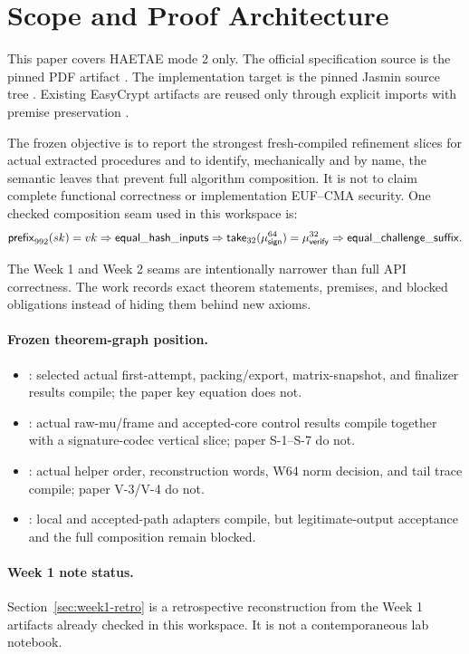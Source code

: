 \section{Scope and Proof Architecture}

This paper covers HAETAE mode 2 only. The official specification source is the
pinned PDF artifact \cite{haetae-pdf}. The implementation target is the pinned
Jasmin source tree \cite{haetae-jasmin}. Existing EasyCrypt artifacts are
reused only through explicit imports with premise preservation
\cite{haetae-ref-easycrypt}.

The frozen objective is to report the strongest fresh-compiled refinement
slices for actual extracted procedures and to identify, mechanically and by
name, the semantic leaves that prevent full algorithm composition.  It is not
to claim complete functional correctness or implementation EUF--CMA security.
One checked composition seam used in this workspace is:
\[
\mathsf{prefix}_{992}(sk) = vk
\Rightarrow \mathsf{equal\_hash\_inputs}
\Rightarrow \mathsf{take}_{32}(\mu_{\mathsf{sign}}^{64}) = \mu_{\mathsf{verify}}^{32}
\Rightarrow \mathsf{equal\_challenge\_suffix}.
\]

The Week 1 and Week 2 seams are intentionally narrower than full API
correctness. The work records exact theorem statements, premises, and blocked
obligations instead of hiding them behind new axioms.

\paragraph{Frozen theorem-graph position.}
\begin{itemize}
  \item {}: selected actual first-attempt, packing/export,
  matrix-snapshot, and finalizer results compile; the paper key equation does
  not.
  \item {}: actual raw-mu/frame and accepted-core control
  results compile together with a signature-codec vertical slice; paper
  S-1--S-7 do not.
  \item {}: actual helper order, reconstruction words,
  W64 norm decision, and tail trace compile; paper V-3/V-4 do not.
  \item {}: local and accepted-path adapters compile,
  but legitimate-output acceptance and the full composition remain blocked.
\end{itemize}

\paragraph{Week 1 note status.}
Section~\ref{sec:week1-retro} is a retrospective reconstruction from the Week 1
artifacts already checked in this workspace. It is not a contemporaneous lab
notebook.
